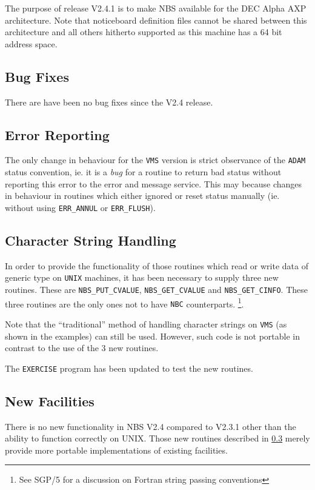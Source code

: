 The purpose of release V2.4.1 is to make NBS available for the DEC Alpha
AXP architecture. Note that noticeboard definition files cannot be shared
between this architecture and all others hitherto supported as this 
machine has a 64 bit address space.

\subsection {Bug Fixes}

There are have been no bug fixes since the V2.4 release.

\subsection{Error Reporting}
\label{Error Reporting}
The only change in behaviour for the {\tt VMS} version is strict
observance of the {\tt ADAM} status convention, ie. it is a {\em bug} 
for a routine to return bad status without reporting this error to the 
error and message service. This may because changes in behaviour in
routines which either ignored or reset status manually (ie. without
using {\tt ERR\_ANNUL} or {\tt ERR\_FLUSH}). 

\subsection{Character String Handling}
\label{String Handling}
In order to provide the functionality of those routines which read
or write data of generic type on {\tt UNIX} machines, it has been
necessary to supply three new routines. These are {\tt NBS\_PUT\_CVALUE},
{\tt NBS\_GET\_CVALUE} and {\tt NBS\_GET\_CINFO}. These
three routines are the only ones not to have {\tt NBC} counterparts.
\footnote{See SGP/5 for a discussion on Fortran 
string passing conventions}. 

Note that the ``traditional'' method of handling character strings
on {\tt VMS} (as shown in the examples) can still be used. However,
such code is not portable in contrast to the use of the 3 new routines.

The {\tt EXERCISE} program has been updated to test the new routines.

\subsection {New Facilities}

There is no new functionality in NBS V2.4 compared to V2.3.1 other than the
ability to function correctly on UNIX. Those new routines described in 
\ref{String Handling} merely provide more portable
implementations of existing facilities. 


